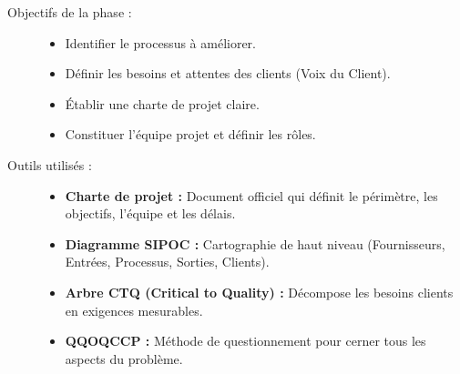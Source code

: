 \documentclass[a4paper,12pt]{article}
\begin{document}
\begin{description}
    \item[Objectifs de la phase :]
    \begin{itemize}
        \item Identifier le processus à améliorer.
        \item Définir les besoins et attentes des clients (Voix du Client).
        \item Établir une charte de projet claire.
        \item Constituer l'équipe projet et définir les rôles.
    \end{itemize}
    
    \item[Outils utilisés :]
    \begin{itemize}
        \item \textbf{Charte de projet :} Document officiel qui définit le périmètre, les objectifs, l'équipe et les délais.
        \item \textbf{Diagramme SIPOC :} Cartographie de haut niveau (Fournisseurs, Entrées, Processus, Sorties, Clients).
        \item \textbf{Arbre CTQ (Critical to Quality) :} Décompose les besoins clients en exigences mesurables.
        \item \textbf{QQOQCCP :} Méthode de questionnement pour cerner tous les aspects du problème.
    \end{itemize}
\end{description}

\begin{center}
\end{center}
\end{document}
